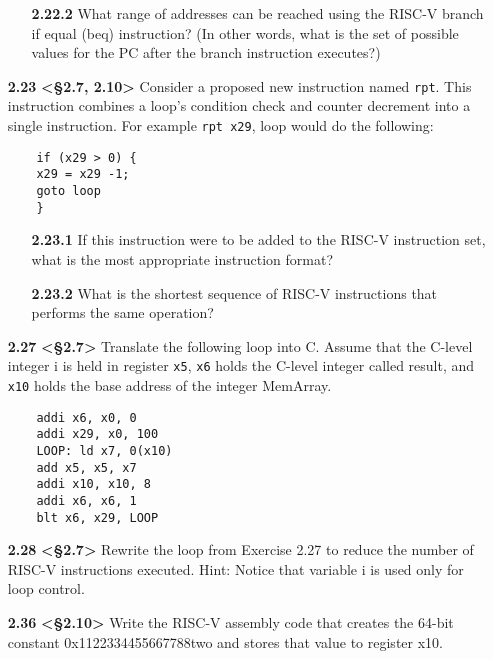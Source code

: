 \documentclass[11pt]{article}
\begin{document}
\begin{enumerate}
\begin{enumerate}
        \item[\textbf{2.22.2}] What range of addresses can be reached using the RISC-V 
        branch if equal (beq) instruction? (In other words, what is the set of possible values 
        for the PC after the branch instruction executes?)
    \end{enumerate}

    \item[\textbf{2.23}] \textbf{<§2.7, 2.10>} Consider a proposed new instruction named \texttt{rpt}. This instruction combines 
    a loop’s condition check and counter decrement into a single instruction. For 
    example \texttt{rpt x29}, loop would do the following:
    \begin{verbatim}
    if (x29 > 0) {
    x29 = x29 -1;
    goto loop
    }
    \end{verbatim}
    
    \begin{enumerate}
        \item[\textbf{2.23.1}] If this instruction were to be added to the RISC-V 
        instruction set, what is the most appropriate instruction format?
        
        \item[\textbf{2.23.2}] What is the shortest sequence of RISC-V instructions that 
        performs the same operation?
    \end{enumerate}
    
    \item[\textbf{2.27}] \textbf{<§2.7>} Translate the following loop into C. Assume that the C-level 
    integer i is held in register \texttt{x5}, \texttt{x6} holds the C-level integer called result, and 
    \texttt{x10} holds the base address of the integer MemArray.
    \begin{verbatim}
    addi x6, x0, 0
    addi x29, x0, 100
    LOOP: ld x7, 0(x10)
    add x5, x5, x7
    addi x10, x10, 8
    addi x6, x6, 1
    blt x6, x29, LOOP
    \end{verbatim}

    \item[\textbf{2.28}] \textbf{<§2.7>} Rewrite the loop from Exercise 2.27 to reduce the number of 
    RISC-V instructions executed. Hint: Notice that variable i is used only for loop 
    control.
    
    \item[\textbf{2.36}] \textbf{<§2.10>} Write the RISC-V assembly code that creates the 64-bit constant 
    0x1122334455667788two and stores that value to register x10.
    

\end{enumerate}
\end{document}
